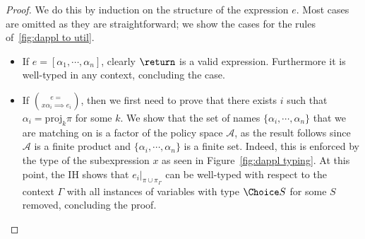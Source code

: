 \begin{proof}
  We do this by induction on the structure of the expression $e$. 
  Most cases are omitted as they are straightforward; we show the cases for the 
  rules of~\cref{fig:dappl to util}.
  \begin{itemize}
    \item If $e = [\alpha_1, \cdots, \alpha_n]$, clearly $\return \tt$ is a valid
    \util{} expression. 
    Furthermore it is well-typed in any context, concluding the case.
    \item If $e = \choose x {\alpha_i \implies e_i}$, then we first need to prove 
    that there exists $i$ such that 
    $\alpha_i = \mathrm{proj}_k \pi$ for some $k$.
    We show that the set of names $\{\alpha_i, \cdots, \alpha_n\}$ 
    that we are matching on is a factor of the policy space 
    $\mathcal A$, as the result follows since $\mathcal A$ is a 
    finite product and $\{\alpha_i, \cdots, \alpha_n\}$ is a finite set.
    Indeed, this is enforced by the type of the subexpression $x$
    as seen in Figure~\ref{fig:dappl typing}. At this point, the 
    IH shows that $e_i|_{\pi \cup \pi_{\Gamma}}$ can be well-typed 
    with respect to the context $\Gamma$ with 
    all instances of variables with type $\Choice S$ for some $S$ removed,
    concluding the proof.
  \end{itemize}
  
  
\end{proof}
